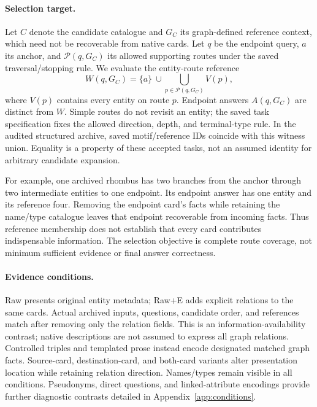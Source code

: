 \paragraph{Selection target.}
Let $C$ denote the candidate catalogue and $G_C$ its graph-defined reference context, which need not be recoverable from native cards. Let $q$ be the endpoint query, $a$ its anchor, and $\mathcal{P}(q,G_C)$ its allowed supporting routes under the saved traversal/stopping rule. We evaluate the entity-route reference
\begin{equation}
 W(q,G_C)=\{a\}\ \cup\!\bigcup_{p\in\mathcal{P}(q,G_C)} V(p),
\end{equation}
where $V(p)$ contains every entity on route $p$. Endpoint answers $A(q,G_C)$ are distinct from $W$. Simple routes do not revisit an entity; the saved task specification fixes the allowed direction, depth, and terminal-type rule. In the audited structured archive, saved motif/reference IDs coincide with this witness union. Equality is a property of these accepted tasks, not an assumed identity for arbitrary candidate expansion.

For example, one archived rhombus has two branches from the anchor through two intermediate entities to one endpoint. Its endpoint answer has one entity and its reference four. Removing the endpoint card's facts while retaining the name/type catalogue leaves that endpoint recoverable from incoming facts. Thus reference membership does not establish that every card contributes indispensable information. The selection objective is complete route coverage, not minimum sufficient evidence or final answer correctness.

\paragraph{Evidence conditions.}
Raw presents original entity metadata; Raw+E adds explicit relations to the same cards. Actual archived inputs, questions, candidate order, and references match after removing only the relation fields. This is an information-availability contrast; native descriptions are not assumed to express all graph relations. Controlled triples and templated prose instead encode designated matched graph facts. Source-card, destination-card, and both-card variants alter presentation location while retaining relation direction. Names/types remain visible in all conditions. Pseudonyms, direct questions, and linked-attribute encodings provide further diagnostic contrasts detailed in Appendix~\ref{app:conditions}.

